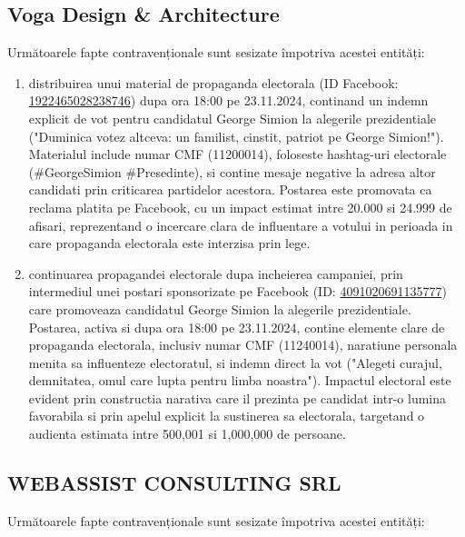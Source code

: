\documentclass[a4paper,12pt]{article}
\begin{document}
\vspace{0.5cm}

\subsection{Voga Design \& Architecture}
Următoarele fapte contravenționale sunt sesizate împotriva acestei entități:

\begin{enumerate}[leftmargin=*, label=\arabic*.)]
    \item distribuirea unui material de propaganda electorala (ID Facebook: \href{https://www.facebook.com/ads/library/?id=1922465028238746}{1922465028238746}) dupa ora 18:00 pe 23.11.2024, continand un indemn explicit de vot pentru candidatul George Simion la alegerile prezidentiale ("Duminica votez altceva: un familist, cinstit, patriot  pe George Simion!"). Materialul include numar CMF (11200014), foloseste hashtag-uri electorale (\#GeorgeSimion \#Presedinte), si contine mesaje negative la adresa altor candidati prin criticarea partidelor acestora. Postarea este promovata ca reclama platita pe Facebook, cu un impact estimat intre 20.000 si 24.999 de afisari, reprezentand o incercare clara de influentare a votului in perioada in care propaganda electorala este interzisa prin lege.
    \item continuarea propagandei electorale dupa incheierea campaniei, prin intermediul unei postari sponsorizate pe Facebook (ID: \href{https://www.facebook.com/ads/library/?id=4091020691135777}{4091020691135777}) care promoveaza candidatul George Simion la alegerile prezidentiale. Postarea, activa si dupa ora 18:00 pe 23.11.2024, contine elemente clare de propaganda electorala, inclusiv numar CMF (11240014), naratiune personala menita sa influenteze electoratul, si indemn direct la vot ("Alegeti curajul, demnitatea, omul care lupta pentru limba noastra"). Impactul electoral este evident prin constructia narativa care il prezinta pe candidat intr-o lumina favorabila si prin apelul explicit la sustinerea sa electorala, targetand o audienta estimata intre 500,001 si 1,000,000 de persoane.
\end{enumerate}

\vspace{0.5cm}

\subsection{WEBASSIST CONSULTING SRL}
Următoarele fapte contravenționale sunt sesizate împotriva acestei entități:
\end{document}
